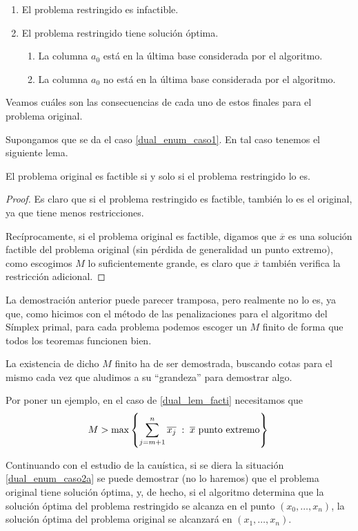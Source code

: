 \begin{enumerate}
	\item \label{dual_enum_caso1}El problema restringido es infactible.
	\item \label{dual_enum_caso2}El problema restringido tiene solución óptima.
	\begin{enumerate}
		\item \label{dual_enum_caso2a}La columna $a_0$ está en la última base considerada por el algoritmo.
		\item \label{dual_enum_caso2b}La columna $a_0$ no está en la última base considerada por el algoritmo.
	\end{enumerate}
\end{enumerate}
Veamos cuáles son las consecuencias de cada uno de estos finales para el problema original.

Supongamos que se da el caso \ref{dual_enum_caso1}. En tal caso tenemos el siguiente lema.
\begin{lem}
	\label{dual_lem_facti}
	El problema original es factible si y solo si el problema restringido lo es.
\end{lem}
\begin{proof}
	Es claro que si el problema restringido es factible, también lo es el original, ya que tiene menos restricciones.
	
	Recíprocamente, si el problema original es factible, digamos que $\overline{x}$ es una solución factible del problema original (sin pérdida de generalidad un punto extremo), como escogimos $M$ lo suficientemente grande, es claro que $\overline{x}$ también verifica la restricción adicional.
\end{proof}
\begin{obs}[Valor de $M$]
	La demostración anterior puede parecer tramposa, pero realmente no lo es, ya que, como hicimos con el método de las penalizaciones para el algoritmo del Símplex primal, para cada problema podemos escoger un $M$ finito de forma que todos los teoremas funcionen bien.
	
	La existencia de dicho $M$ finito ha de ser demostrada, buscando cotas para el mismo cada vez que aludimos a su ``grandeza'' para demostrar algo.
	
	Por poner un ejemplo, en el caso de \ref{dual_lem_facti} necesitamos que
	\begin{equation*}
		M>\max\left\{\sum_{j=m+1}^{n}\overline{x_j}\;:\; \overline{x}\text{ punto extremo}\right\}\qedhere
	\end{equation*}
\end{obs}
Continuando con el estudio de la cauística, si se diera la situación \ref{dual_enum_caso2a} se puede demostrar (no lo haremos) que el problema original tiene solución óptima, y, de hecho, si el algoritmo determina que la solución óptima del problema restringido se alcanza en el punto $(x_0,\dots,x_n)$, la solución óptima del problema original se alcanzará en $(x_1,\dots,x_n)$.

